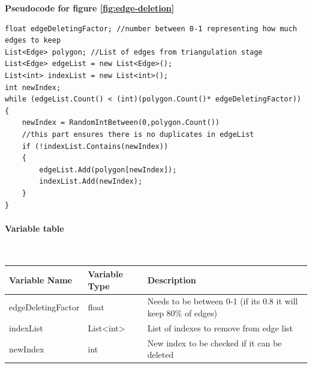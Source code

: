 \documentclass{article}
\newcommand{\myparagraph}[1]{\paragraph{#1}\mbox{}\\} %
\newcommand{\smallBr}{\vspace{1.5mm}}
\begin{document}
\pagebreak

\textbf{Pseudocode for figure \ref{fig:edge-deletion}}
\begin{lstlisting}
float edgeDeletingFactor; //number between 0-1 representing how much edges to keep
List<Edge> polygon; //List of edges from triangulation stage
List<Edge> edgeList = new List<Edge>();
List<int> indexList = new List<int>();
int newIndex;
while (edgeList.Count() < (int)(polygon.Count()* edgeDeletingFactor))
{
	newIndex = RandomIntBetween(0,polygon.Count())
	//this part ensures there is no duplicates in edgeList
	if (!indexList.Contains(newIndex))
	{
		edgeList.Add(polygon[newIndex]);
		indexList.Add(newIndex);
	}
}
\end{lstlisting}

\myparagraph{Variable table}
\smallBr
\begin{tabular}{l|l|l}
Variable Name      & Variable Type                    & Description                                                     \\ \hline
edgeDeletingFactor & float                            & Needs to be between 0-1 (if its 0.8 it will keep 80\% of edges) \\
indexList          & List\textless{}int\textgreater{} & List of indexes to remove from edge list                        \\
newIndex           & int                              & New index to be checked if it can be deleted                   
\end{tabular}
\end{document}

